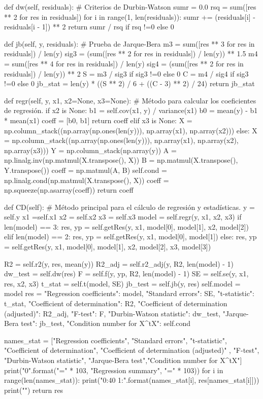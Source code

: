 \begin{pylabcode}[plotsession]
	def dw(self, residuals): # Criterios de Durbin-Watson
		sumr = 0.0
		rsq = sum([res ** 2 for res in residuals])
		for i in range(1, len(residuals)):
			sumr += (residuals[i] - residuals[i - 1]) ** 2
		return sumr / rsq if rsq !=0 else 0

	def jb(self, y, residuals): # Prueba de Jarque-Bera
		m3 = sum([res ** 3 for res in residuals]) / len(y)
		sig3 = (sum([res ** 2 for res in residuals]) / len(y)) ** 1.5
		m4 = sum([res ** 4 for res in residuals]) / len(y)
		sig4 = (sum([res ** 2 for res in residuals]) / len(y)) ** 2
		S = m3 / sig3 if sig3 !=0 else 0
		C = m4 / sig4 if sig3 !=0 else 0
		jb_stat = len(y) * ((S ** 2) / 6 + ((C - 3) ** 2) / 24)
		return jb_stat

	def regr(self, y, x1, x2=None, x3=None): # Método para calcular los coeficientes de regresión.
		if x2 is None:
			b1 = self.cov(x1, y) / variance(x1)
			b0 = mean(y) - b1 * mean(x1)
			coeff = [b0, b1]
			return coeff
		elif x3 is None:
			X = np.column_stack((np.array(np.ones(len(y))), np.array(x1), np.array(x2)))
		else:
			X = np.column_stack((np.array(np.ones(len(y))), np.array(x1), np.array(x2), np.array(x3)))
		Y = np.column_stack(np.array(y))
		A = np.linalg.inv(np.matmul(X.transpose(), X))
		B = np.matmul(X.transpose(), Y.transpose())
		coeff = np.matmul(A, B)
		self.cond = np.linalg.cond(np.matmul(X.transpose(), X))
		coeff = np.squeeze(np.asarray(coeff))
		return coeff

	def CD(self): # Método principal para el cálculo de regresión y estadísticas.
		y = self.y
		x1 =self.x1
		x2 = self.x2
		x3 = self.x3
		model = self.regr(y, x1, x2, x3)
		if len(model) == 3:
			res, yp = self.getRes(y, x1, model[0], model[1], x2, model[2])
		elif len(model) == 2:
			res, yp = self.getRes(y, x1, model[0], model[1])
		else:
			res, yp = self.getRes(y, x1, model[0], model[1], x2, model[2], x3, model[3])
	
		R2 = self.r2(y, res, mean(y))
		R2_adj = self.r2_adj(y, R2, len(model) - 1)
		dw_test = self.dw(res)
		F = self.f(y, yp, R2, len(model) - 1)
		SE = self.se(y, x1, res, x2, x3)
		t_stat = self.t(model, SE)
		jb_test = self.jb(y, res)
		self.model = model
		res = {"Regression coefficients": model,
			"Standard errors": SE,
			"t-statistic": t_stat,
			"Coefficient of determination": R2,
			"Coefficient of determination (adjusted)": R2_adj,
			"F-test": F,
			"Durbin-Watson statistic": dw_test,
			"Jarque-Bera test": jb_test,
			"Condition number for X^tX": self.cond}
	
		names_stat = ["Regression coefficients", "Standard errors", "t-statistic", "Coefficient of determination", "Coefficient of determination (adjusted)"
		, "F-test", "Durbin-Watson statistic", "Jarque-Bera test","Condition number for X^tX"]
		print("{0}".format("=" * 103, "Regression summary", "=" * 103))
		for i in range(len(names_stat)):
			print("{0:40} {1:}".format(names_stat[i], res[names_stat[i]]))
		print("\n")
		return res


\end{pylabcode}
